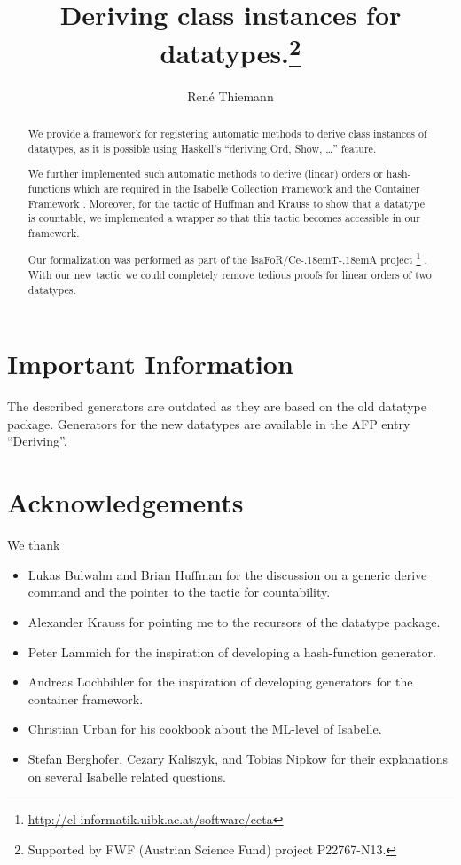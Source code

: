 \documentclass[11pt,a4paper]{article}
\newcommand\isafor{\textsf{IsaFoR}}
\newcommand\ceta{\textsf{Ce\kern-.18emT\kern-.18emA}}
\begin{document}
\title{Deriving class instances for datatypes.\footnote{Supported by FWF (Austrian Science Fund) project P22767-N13.}}
\author{Ren\'e Thiemann}
\maketitle

\begin{abstract}
  We provide a framework for registering automatic methods 
  to derive class instances 
  of datatypes, 
  as it is possible using Haskell's ``deriving Ord, Show, \ldots'' feature.
  
  We further implemented such automatic methods to derive (linear) orders or
  hash-functions which are required in the 
  Isabelle Collection Framework \cite{rbt} and the Container Framework \cite{containers}. 
  Moreover, for the tactic of
  Huffman and Krauss to show that a datatype is countable, we implemented a 
  wrapper so that this tactic becomes accessible in our framework.
  
  Our formalization was performed as part of the \isafor/\ceta{} project%
  \footnote{\url{http://cl-informatik.uibk.ac.at/software/ceta}} \cite{CeTA}.
  With our new tactic we could completely remove 
  tedious proofs for linear orders of two datatypes.
\end{abstract}

\tableofcontents

\section{Important Information}
The described generators are outdated as they are based on the old datatype package.
Generators for the new datatypes are available in the AFP entry ``Deriving''.



\section{Acknowledgements}
We thank 
\begin{itemize}
\item Lukas Bulwahn and Brian Huffman for the discussion on a generic derive command and 
  the pointer to
  the tactic for countability.
\item Alexander Krauss for pointing me to the
  recursors of the datatype package.
\item Peter Lammich for the inspiration of developing a hash-function generator.
\item Andreas Lochbihler for the inspiration of developing generators for the container framework.
\item Christian Urban for his cookbook about the ML-level of Isabelle.
\item Stefan Berghofer, Cezary Kaliszyk, and Tobias Nipkow for their explanations
  on several Isabelle related questions.
\end{itemize}



\end{document}
